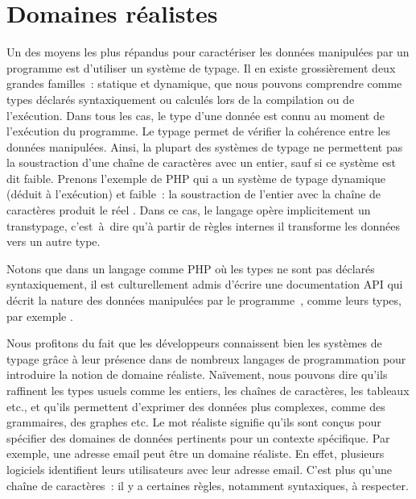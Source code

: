 \section{Domaines réalistes}
\label{section:language:realdoms}

Un des moyens les plus répandus pour caractériser les données manipulées par un
programme est d'utiliser un système de {\strong typage}. Il en existe
grossièrement deux grandes familles~: {\strong statique} et {\strong dynamique},
que nous pouvons comprendre comme types déclarés syntaxiquement ou calculés lors
de la compilation ou de l'exécution. Dans tous les cas, le type d'une donnée est
connu au moment de l'exécution du programme. Le typage permet de {\strong
vérifier} la cohérence entre les données manipulées. Ainsi, la plupart des
systèmes de typage ne permettent pas la soustraction d'une chaîne de caractères
avec un entier, sauf si ce système est dit faible. Prenons l'exemple de PHP qui
a un système de typage dynamique (déduit à l'exécution) et faible~: la
soustraction de l'entier  avec la chaîne de caractères 
produit le réel . Dans ce cas, le langage opère implicitement un
transtypage, c'est~à~dire qu'à partir de règles internes il transforme les
données vers un autre type.

Notons que dans un langage comme PHP où les types ne sont pas déclarés
syntaxiquement, il est culturellement admis d'écrire une documentation API qui
décrit la nature des données manipulées par le programme~, comme
leurs types, par exemple .

Nous profitons du fait que les développeurs connaissent bien les systèmes de
typage grâce à leur présence dans de nombreux langages de programmation pour
introduire la notion de {\strong domaine réaliste}. Naïvement, nous pouvons dire
qu'ils raffinent les types usuels comme les entiers, les chaînes de caractères,
les tableaux etc., et qu'ils permettent d'exprimer des données plus complexes,
comme des grammaires, des graphes etc. Le mot {\strong réaliste} signifie qu'ils
sont conçus pour spécifier des domaines de données pertinents pour un contexte
spécifique. Par exemple, une adresse email peut être un domaine réaliste. En
effet, plusieurs logiciels identifient leurs utilisateurs avec leur adresse
email. C'est plus qu'une chaîne de caractères~: il y a certaines règles,
notamment syntaxiques, à respecter.

